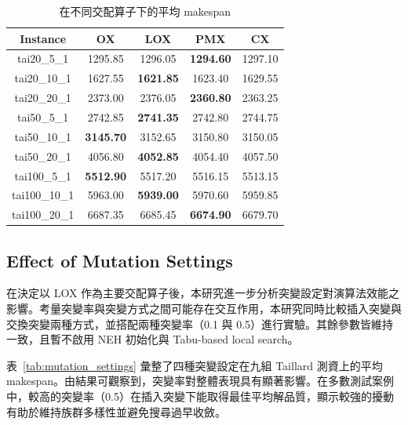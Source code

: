 \documentclass[conference]{IEEEtran}
\begin{document}
\begin{table}[H]
\centering
\caption{在不同交配算子下的平均 makespan}
\label{tab:crossover_avg}
\begin{tabular}{c|c|c|c|c}
\hline
Instance & OX & LOX & PMX & CX \\
\hline
tai20\_5\_1   & 1295.85 & 1296.05 & \textbf{1294.60} & 1297.10 \\
tai20\_10\_1  & 1627.55 & \textbf{1621.85} & 1623.40 & 1629.55 \\
tai20\_20\_1  & 2373.00 & 2376.05 & \textbf{2360.80} & 2363.25 \\
tai50\_5\_1   & 2742.85 & \textbf{2741.35} & 2742.80 & 2744.75 \\
tai50\_10\_1  & \textbf{3145.70} & 3152.65 & 3150.80 & 3150.05 \\
tai50\_20\_1  & 4056.80 & \textbf{4052.85} & 4054.40 & 4057.50 \\
tai100\_5\_1  & \textbf{5512.90} & 5517.20 & 5516.15 & 5513.15 \\
tai100\_10\_1 & 5963.00 & \textbf{5939.00} & 5970.60 & 5959.85 \\
tai100\_20\_1 & 6687.35 & 6685.45 & \textbf{6674.90} & 6679.70 \\
\hline
\end{tabular}
\end{table}

\subsection{Effect of Mutation Settings}
在決定以 LOX 作為主要交配算子後，本研究進一步分析突變設定對演算法效能之影響。考量突變率與突變方式之間可能存在交互作用，本研究同時比較插入突變與交換突變兩種方式，並搭配兩種突變率（0.1 與 0.5）進行實驗。其餘參數皆維持一致，且暫不啟用 NEH 初始化與 Tabu-based local search。

表~\ref{tab:mutation_settings} 彙整了四種突變設定在九組 Taillard 測資上的平均 makespan。由結果可觀察到，突變率對整體表現具有顯著影響。在多數測試案例中，較高的突變率（0.5）在插入突變下能取得最佳平均解品質，顯示較強的擾動有助於維持族群多樣性並避免搜尋過早收斂。
\end{document}
